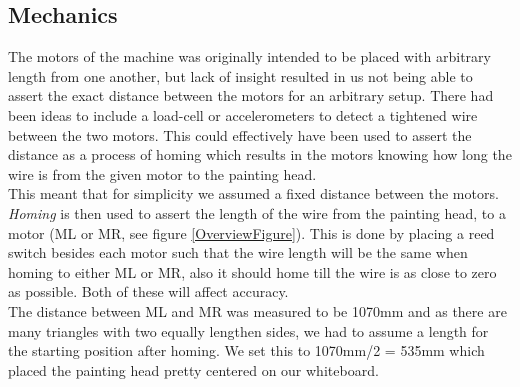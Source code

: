 \subsection{Mechanics}
The motors of the machine was originally intended to be placed with arbitrary length from one another, but lack of insight resulted in us not being able to assert the exact distance between the motors for an arbitrary setup. There had been ideas to include a load-cell or accelerometers to detect a tightened wire between the two motors. This could effectively have been used to assert the distance as a process of homing which results in the motors knowing how long the wire is from the given motor to the painting head.\\
This meant that for simplicity we assumed a fixed distance between the motors. {\it Homing} is then used to assert the length of the wire from the painting head, to a motor (ML or MR, see figure \ref{OverviewFigure}). This is done by placing a reed switch besides each motor such that the wire length will be the same when homing to either ML or MR, also it should home till the wire is as close to zero as possible. Both of these will affect accuracy.\\
The distance between ML and MR was measured to be 1070mm and as there are many triangles with two equally lengthen sides, we had to assume a length for the starting position after homing. We set this to 1070mm/2 = 535mm which placed the painting head pretty centered on our whiteboard. 

